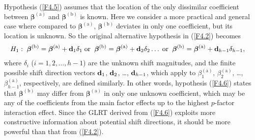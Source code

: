 Hypothesis (\ref{F4.5}) assumes that the location of the only dissimilar coefficient
between $\bm\beta^{(\mathrm{a})}$ and $\bm\beta^{(\mathrm{b})}$ is known. Here we
consider a more practical and general case where compared to
$\bm\beta^{(\mathrm{a})}$, $\bm\beta^{(\mathrm{b})}$ deviates in only one
coefficient, but its location is unknown. So the original alternative hypothesis in
(\ref{F4.2}) becomes
\begin{align}
H_1:\;\bm{\beta}^{(\mathrm{b})}=\bm{\beta}^{(\mathrm{a})}+{\bf d}_1\delta_1
\;\mathrm{or}\;\;\bm{\beta}^{(\mathrm{b})}=\bm{\beta}^{(\mathrm{a})}+{\bf
d}_2\delta_2\ldots\;
\mathrm{or}\;\;\bm{\beta}^{(\mathrm{b})}=\bm{\beta}^{(\mathrm{a})}+{\bf
d}_{h-1}\delta_{h-1},\label{F4.6}
\end{align}
where $\delta_i$ ($i=1,2,\ldots,h-1$) are the unknown shift magnitudes, and the
finite possible shift direction vectors ${\bf d}_1$, ${\bf d}_2$, \ldots, ${\bf
d}_{h-1}$, which apply to $\beta^{(\mathrm{a})}_1$, $\beta^{(\mathrm{a})}_2$,
\ldots, $\beta^{(\mathrm{a})}_{h-1}$, respectively, are defined similarly. In other
words, hypothesis (\ref{F4.6}) states that $\bm\beta^{(\mathrm{b})}$ may differ from
$\bm\beta^{(\mathrm{a})}$ in only one unknown coefficient, which may be any of the
coefficients from the main factor effects up to the highest $p$-factor interaction
effect. Since the GLRT derived from (\ref{F4.6}) exploits more constructive
information about potential shift directions, it should be more powerful than that
from (\ref{F4.2}).

